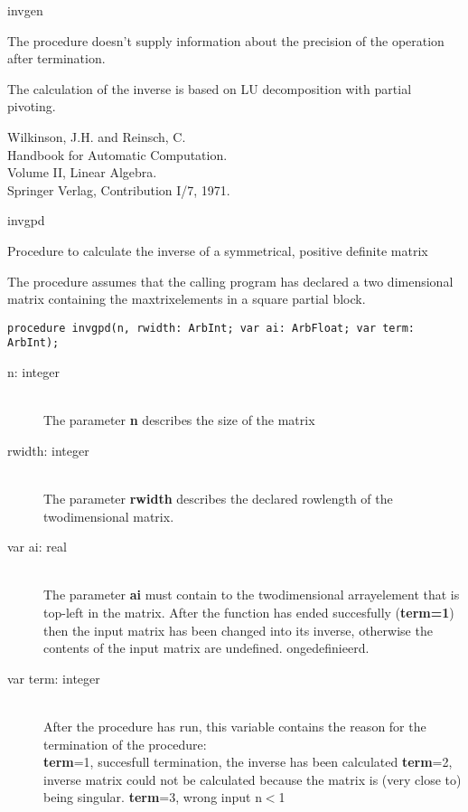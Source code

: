 \documentclass{report}
\newcommand{\FunctionDescription}{\item[Description]\rmfamily}
\newcommand{\Dataorganisation}{\item[Data Struct]\rmfamily}
\newcommand{\DeclarationandParams}{\item[Declaration]\rmfamily}
\newcommand{\References}{\item[References]\rmfamily}
\newcommand{\Method}{\item[Method]\rmfamily}
\newcommand{\Precision}{\item[Precision]\rmfamily}
\newcommand{\Remarks}{\item[Remarks]\rmfamily}
\begin{document}
\begin{procedure}{invgen}
\Precision

The procedure doesn't supply information about the precision of the
operation after termination.

\Method

The calculation of the inverse is based on LU decomposition with partial
pivoting.

\References

 Wilkinson, J.H. and Reinsch, C.\\
 Handbook for Automatic Computation.\\
 Volume II, Linear Algebra.\\
 Springer Verlag, Contribution I/7, 1971.

\end{procedure}

\begin{procedure}{invgpd}

\FunctionDescription

Procedure to calculate the inverse of a symmetrical, positive definite
matrix


\Dataorganisation
The procedure assumes that the calling program has declared a two dimensional
matrix containing the maxtrixelements in a square partial block.

\DeclarationandParams

\lstinline|procedure invgpd(n, rwidth: ArbInt; var ai: ArbFloat; var term: ArbInt);|

\begin{description}
 \item[n: integer] \mbox{ } \\
    The parameter {\bf n} describes the size of the matrix
 \item[rwidth: integer] \mbox{} \\
    The parameter {\bf rwidth} describes the declared rowlength of the twodimensional
    matrix.
 \item[var ai: real] \mbox{} \\
    The parameter {\bf ai} must contain to the twodimensional arrayelement
    that is top-left in the matrix.
    After the function has ended succesfully (\textbf{term=1}) then 
    the input matrix has been changed into its inverse, otherwise the contents 
    of the input matrix are undefined.
    ongedefinieerd.
 \item[var term: integer]  \mbox{} \\
    After the procedure has run, this variable contains the reason for 
    the termination of the procedure:\\
      {\bf term}=1, succesfull termination, the inverse has been calculated
      {\bf term}=2, inverse matrix could not be calculated because the matrix
		    is (very close to) being singular.
      {\bf term}=3, wrong input n$<$1
\end{description}
\Remarks


\end{procedure}
\end{document}

